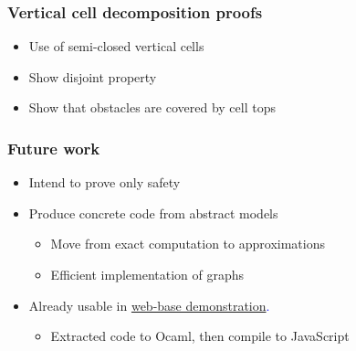 \documentclass[compress]{beamer}
\begin{document}
\begin{frame}
\frametitle{Vertical cell decomposition proofs}
\begin{itemize}
\item Use of semi-closed vertical cells
\item Show disjoint property
\item Show that obstacles are covered by cell tops
\end{itemize}
\end{frame}
\begin{frame}
\frametitle{Future work}
\begin{itemize}
\item Intend to prove only safety
\item Produce concrete code from abstract models
\begin{itemize}
\item Move from exact computation to approximations
\item Efficient implementation of graphs
\end{itemize}
\item Already usable in \textcolor{blue}{\href{https://stamp.gitlabpages.inria.fr/trajectories.html}{web-base demonstration}.}
\begin{itemize}
\item Extracted code to Ocaml, then compile to JavaScript
\end{itemize}
\end{itemize}
\end{frame}
\end{document}
